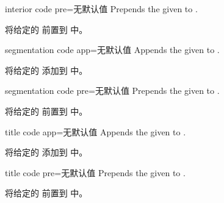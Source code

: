 \begin{docTcbKey}{interior code pre}{=}{无默认值}
Prepends the given  to .

将给定的  前置到  中。
\end{docTcbKey}

\begin{docTcbKey}{segmentation code app}{=}{无默认值}
Appends the given  to .

将给定的  添加到  中。
\end{docTcbKey}

\begin{docTcbKey}{segmentation code pre}{=}{无默认值}
Prepends the given  to .

将给定的  前置到  中。
\end{docTcbKey}


\begin{docTcbKey}{title code app}{=}{无默认值}
Appends the given  to .

将给定的  添加到  中。
\end{docTcbKey}

\begin{docTcbKey}{title code pre}{=}{无默认值}
Prepends the given  to .

将给定的  前置到  中。
\end{docTcbKey}

